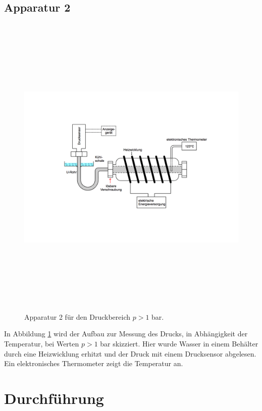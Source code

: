 \newpage

\subsection{Apparatur 2}

  \begin{figure}[h!]
    \centering
    \includegraphics[height = 15cm]{Apparatur2.pdf}
    \caption{Apparatur 2 für den Druckbereich $p > 1$ \si{bar}.}
    \label{fig: Apparatur2}
  \end{figure}

\FloatBarrier

In Abbildung \ref{fig: Apparatur2} wird der Aufbau zur Messung des Drucks, in Abhängigkeit der
Temperatur, bei Werten $p > 1$ \si{bar} skizziert. Hier wurde Wasser in einem Behälter durch eine
Heizwicklung erhitzt und der Druck mit einem Drucksensor abgelesen. Ein elektronisches Thermometer
zeigt die Temperatur an.

\newpage

\section{Durchführung}
\label{sec:Durchführung}

